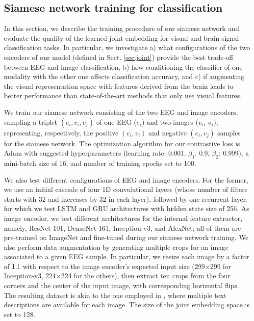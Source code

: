 \documentclass[10pt,journal,compsoc,twocolumn]{IEEEtran}
\begin{document}
\subsection{Siamese network training for classification}\label{sec:classification}
In this section, we describe the training procedure of our siamese network and evaluate the quality of the learned joint embedding for visual and brain signal classification tasks. In particular, we investigate a) what configurations of the two encoders of our model (defined in Sect. \ref{sec:joint}) provide the best trade-off between EEG and image classification, b) how conditioning the classifier of one modality with the other one affects classification accuracy, and c) if augmenting the visual representation space with features derived from the brain leads to better performance than state-of-the-art methods that only use visual features. 

We train our siamese network consisting of the two EEG and image encoders, sampling a triplet $(e_i, v_i, v_j)$ of one EEG ($e_i$) and two images ($v_i$, $v_j$), representing, respectively, the positive $(e_i, v_i)$ and negative $(e_i, v_j)$ samples for the siamese network. The optimization algorithm for our contrastive loss is Adam with suggested hyperparameters (learning rate: 0.001, $\beta_1$: 0.9, $\beta_2$: 0.999), a mini-batch size of 16, and number of training epochs set to 100.

We also test different configurations of EEG and image encoders. For the former, we use an initial cascade of four 1D convolutional layers (whose number of filters starts with 32 and increases by 32 in each layer), followed by one recurrent layer, for which we test LSTM and GRU architectures with hidden state size of 256. As image encoder, we test different architectures for the internal feature extractor, namely, ResNet-101, DenseNet-161, Inception-v3, and AlexNet; all of them are pre-trained on ImageNet and fine-tuned during our siamese network training. We also perform data augmentation by generating multiple crops for an image associated to a given EEG sample. In particular, we resize each image by a factor of 1.1 with respect to the image encoder's expected input size (299$\times$299 for Inception-v3, 224$\times$224 for the others), then extract ten crops from the four corners and the center of the input image, with corresponding horizontal flips. The resulting dataset is akin to the one employed in \cite{Reed2016learning}, where multiple text descriptions are available for each image. The size of the joint embedding space is set to 128.
\end{document}
